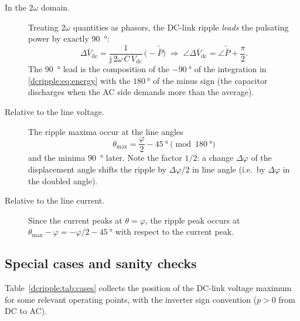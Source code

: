 \begin{description}
  \item[In the $2\omega$ domain.] Treating $2\omega$ quantities as phasors, the
        DC-link ripple \emph{leads} the pulsating power by exactly
        \SI{90}{\degree}:
        \begin{equation}
          \Delta \bar V_{\mathrm{dc}} =
          \frac{1}{\mathrm{j}\,2\omega\,C\,V_{\mathrm{dc}}}\,
          \bigl(-\tilde{\bar P}\bigr)
          \;\Longrightarrow\;
          \angle \Delta \bar V_{\mathrm{dc}}
          = \angle \tilde{\bar P} + \frac{\pi}{2}.
        \end{equation}
        The \SI{90}{\degree} lead is the composition of the
        $-\SI{90}{\degree}$ of the integration in \eqref{dcripple:eq:energy} with the
        $\SI{180}{\degree}$ of the minus sign (the capacitor discharges when the
        AC side demands more than the average).
  \item[Relative to the line voltage.] The ripple maxima occur at the line
        angles
        \begin{equation}
          \boxed{\;\theta_{\max} = \frac{\varphi}{2} - \SI{45}{\degree}
          \pmod{\SI{180}{\degree}} \;}
          \label{dcripple:eq:thmax}
        \end{equation}
        and the minima \SI{90}{\degree} later. Note the factor $1/2$: a change
        $\Delta\varphi$ of the displacement angle shifts the ripple by
        $\Delta\varphi/2$ in line angle (i.e.\ by $\Delta\varphi$ in the doubled
        angle).
  \item[Relative to the line current.] Since the current peaks at
        $\theta = \varphi$, the ripple peak occurs at
        $\theta_{\max} - \varphi = -\varphi/2 - \SI{45}{\degree}$ with respect
        to the current peak.
\end{description}

\subsection{Special cases and sanity checks}

Table~\ref{dcripple:tab:cases} collects the position of the DC-link voltage maximum for
some relevant operating points, with the inverter sign convention
($p > 0$ from DC to AC).

